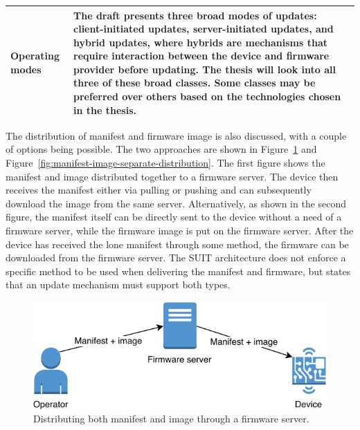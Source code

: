 \documentclass[0-thesis.tex]{subfiles}
\begin{document}
\begin{small}
\begin{longtable}[]{@{}ll@{}}
\begin{minipage}[t]{0.41\columnwidth}
        Operating modes\strut
        \end{minipage} & \begin{minipage}[t]{0.53\columnwidth}\raggedright\strut
        The draft presents three broad modes of updates: client-initiated
        updates, server-initiated updates, and hybrid updates, where hybrids are
        mechanisms that require interaction between the device and firmware
        provider before updating. The thesis will look into all three of these
        broad classes. Some classes may be preferred over others based on the
        technologies chosen in the thesis.\strut
        \end{minipage}\tabularnewline
        \bottomrule
\end{longtable}
\end{small}
        

The distribution of manifest and firmware image is also discussed, with a couple of
options being possible. The two approaches are shown in
Figure~\ref{fig:manifest-image-combined-distribution} and
Figure~\ref{fig:manifest-image-separate-distribution}. The first figure shows the manifest
and image distributed together to a firmware server. The device then receives the manifest
either via pulling or pushing and can subsequently download the image from the same
server. Alternatively, as shown in the second figure, the manifest itself can be directly
sent to the device without a need of a firmware server, while the firmware image is put on
the firmware server. After the device has received the lone manifest through some method,
the firmware can be downloaded from the firmware server. The SUIT architecture does not
enforce a specific method to be used when delivering the manifest and firmware, but states
that an update mechanism must support both types.

\begin{figure}[h]
    \caption{Distributing both manifest and image through a firmware server.}   
    \label{fig:manifest-image-combined-distribution}
    \includegraphics{images/together.pdf}
\end{figure}
\end{document}

